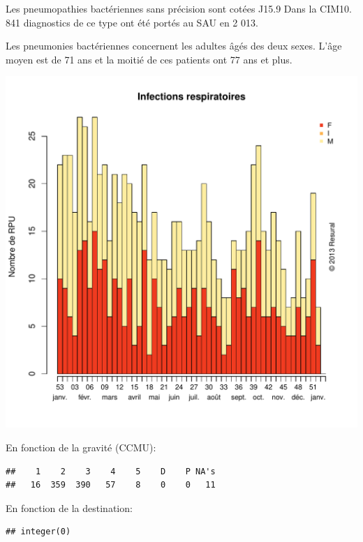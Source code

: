 \documentclass[12pt,english,french,twoside]{book}\usepackage[]{graphicx}\usepackage[]{color}
\makeatletter
\def\maxwidth{ %
  \ifdim\Gin@nat@width>\linewidth
    \linewidth
  \else
    \Gin@nat@width
  \fi
}
\newenvironment{kframe}{%
 \def\at@end@of@kframe{}%
 \ifinner\ifhmode%
  \def\at@end@of@kframe{\end{minipage}}%
  \begin{minipage}{\columnwidth}%
 \fi\fi%
 \def\FrameCommand##1{\hskip\@totalleftmargin \hskip-\fboxsep
 \colorbox{shadecolor}{##1}\hskip-\fboxsep
     \hskip-\linewidth \hskip-\@totalleftmargin \hskip\columnwidth}%
 \MakeFramed {\advance\hsize-\width
   \@totalleftmargin\z@ \linewidth\hsize
   \@setminipage}}%
 {\par\unskip\endMakeFramed%
 \at@end@of@kframe}
\newenvironment{knitrout}{}{} %
\makeatother
\begin{document}
Les pneumopathies bactériennes sans précision sont cotées J15.9 Dans la CIM10.
841 diagnostics de ce type ont été portés au SAU en 2 013.

Les pneumonies bactériennes concernent les adultes âgés des deux sexes. L'âge moyen est de 71 ans et la moitié de ces patients ont 77 ans et plus.

\begin{knitrout}
\color{fgcolor}
\includegraphics[width=\maxwidth]{figure/pneumo} 

\end{knitrout}


En fonction de la gravité (CCMU):
\begin{knitrout}
\color{fgcolor}\begin{kframe}
\begin{verbatim}
##    1    2    3    4    5    D    P NA's 
##   16  359  390   57    8    0    0   11
\end{verbatim}
\end{kframe}
\end{knitrout}


En fonction de la destination:
\begin{knitrout}
\color{fgcolor}\begin{kframe}
\begin{verbatim}
## integer(0)
\end{verbatim}
\end{kframe}
\end{knitrout}
\end{document}
